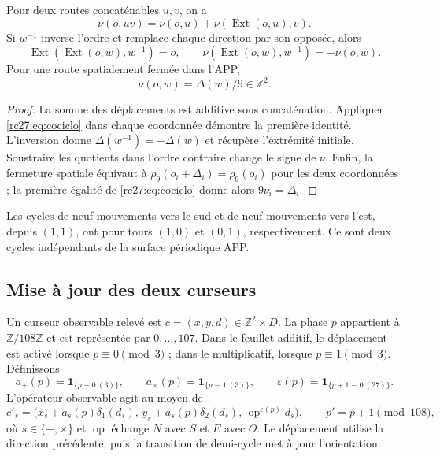 \begin{proposition}
Pour deux routes concaténables $u,v$, on a
\[
\nu(o,uv)=\nu(o,u)+\nu(\operatorname{Ext}(o,u),v).
\]
Si $w^{-1}$ inverse l'ordre et remplace chaque direction par son
opposée, alors
\[
\operatorname{Ext}(\operatorname{Ext}(o,w),w^{-1})=o,
\qquad
\nu(\operatorname{Ext}(o,w),w^{-1})=-\nu(o,w).
\]
Pour une route spatialement fermée dans l'APP,
\[
\nu(o,w)=\Delta(w)/9\in\mathbb Z^2.
\]
\end{proposition}
\begin{proof}
La somme des déplacements est additive sous concaténation. Appliquer
\eqref{rc27:eq:cociclo} dans chaque coordonnée démontre la première
identité. L'inversion donne $\Delta(w^{-1})=-\Delta(w)$ et récupère
l'extrémité initiale. Soustraire les quotients dans l'ordre contraire change
le signe de $\nu$. Enfin, la fermeture spatiale équivaut à
$\rho_9(o_i+\Delta_i)=\rho_9(o_i)$ pour les deux coordonnées ; la première
égalité de \eqref{rc27:eq:cociclo} donne alors $9\nu_i=\Delta_i$.
\end{proof}

Les cycles de neuf mouvements vers le sud et de neuf mouvements vers l'est,
depuis $(1,1)$, ont pour tours $(1,0)$ et $(0,1)$, respectivement.
Ce sont deux cycles indépendants de la surface périodique APP.

\subsection{Mise à jour des deux curseurs}

Un curseur observable relevé est $c=(x,y,d)\in\mathbb Z^2\times D$.
La phase $p$ appartient à $\mathbb Z/108\mathbb Z$ et est représentée
par $0,\ldots,107$. Dans le feuillet additif, le déplacement est activé
lorsque $p\equiv0\pmod3$ ; dans le multiplicatif, lorsque
$p\equiv1\pmod3$. Définissons
\[
a_+(p)=\mathbf1_{\{p\equiv0\ (3)\}},\qquad
a_\times(p)=\mathbf1_{\{p\equiv1\ (3)\}},\qquad
\varepsilon(p)=\mathbf1_{\{p+1\equiv0\ (27)\}}.
\]
L'opérateur observable agit au moyen de
\begin{equation}
c'_s=\bigl(x_s+a_s(p)\delta_1(d_s),\,
           y_s+a_s(p)\delta_2(d_s),\,
           \operatorname{op}^{\varepsilon(p)}d_s\bigr),
\qquad p'=p+1\pmod{108},
\label{rc27:eq:actualizacion}
\end{equation}
où $s\in\{+,\times\}$ et $\operatorname{op}$ échange
$N$ avec $S$ et $E$ avec $O$.
Le déplacement utilise la direction précédente, puis la
transition de demi-cycle met à jour l'orientation.


